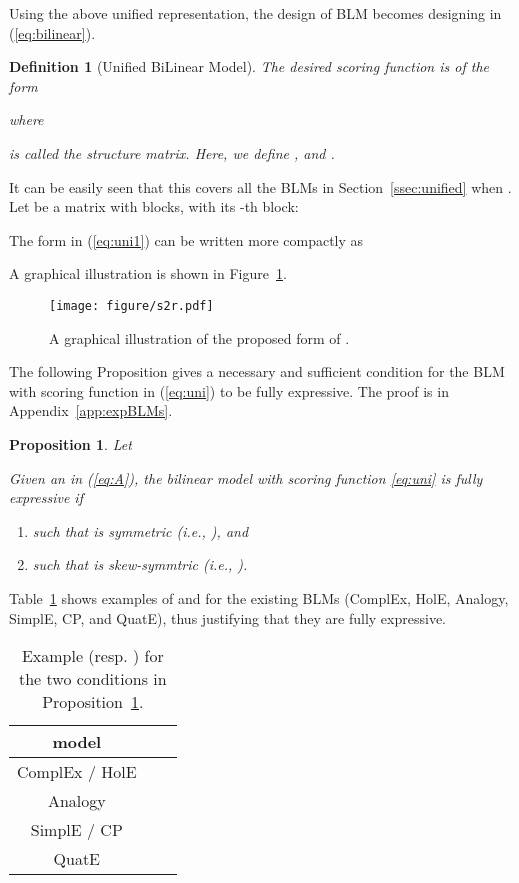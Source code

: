 \documentclass[10pt,journal,compsoc]{IEEEtran}
\newtheorem{prop}{Proposition}
\newtheorem{definition}{Definition}
\begin{document}
Using the above unified representation, 
the design of BLM becomes designing  in (\ref{eq:bilinear}).

\begin{definition}[Unified BiLinear Model] 
	\label{def:unify}
The desired scoring function is  of the form

where
 
is called the {\em structure matrix}.
Here, we define , and .
\end{definition}
It can be easily seen that this covers all the BLMs 
in Section~\ref{ssec:unified}
when .  
Let  
be a matrix with  blocks, with its -th block:

The form in (\ref{eq:uni1}) can be written more compactly as
 
A graphical illustration is shown in Figure~\ref{fig:autosf}.

\begin{figure}[ht]
\centering
\vspace{-4px}
\texttt{[image: figure/s2r.pdf]}
\vspace{-8px}
\caption{A graphical illustration of 
the proposed form of .}
\vspace{-4px}
\label{fig:autosf}
\end{figure}


The following Proposition gives a necessary and sufficient condition for the
BLM  with scoring function
in (\ref{eq:uni})
to be fully expressive.
The proof is in Appendix~\ref{app:expBLMs}.

\begin{prop} \label{pr:expBLMs}
Let
 
Given an 
in (\ref{eq:A}),
the bilinear model with scoring function 
\eqref{eq:uni}
is fully expressive
if
\begin{enumerate}
\item  
such that 
 is symmetric (i.e.,
),
and
\item  
such that 
 is skew-symmtric
(i.e.,
).
\end{enumerate}
\end{prop}
Table~\ref{tab:conditions} shows examples 
		of    and   
for the existing BLMs  (ComplEx, HolE, Analogy, SimplE, CP, and QuatE), thus justifying that they are fully expressive.

\begin{table}[ht]
	\centering
\caption{Example
		   (resp. ) for 
the 
two conditions
in Proposition~\ref{pr:expBLMs}.}
	\label{tab:conditions}
	\vspace{-10px}
	\setlength\tabcolsep{8pt}
	\renewcommand{\arraystretch}{1.1}
	\begin{tabular}{c|c|c}
		\toprule
		model &    &    \\
		\midrule
		ComplEx / HolE &   &  \\
		Analogy  &   &  \\
		SimplE / CP &   &  \\
		QuatE  &     &   \\
		\bottomrule
	\end{tabular}
\vspace{-10px}
\end{table}
\end{document}
